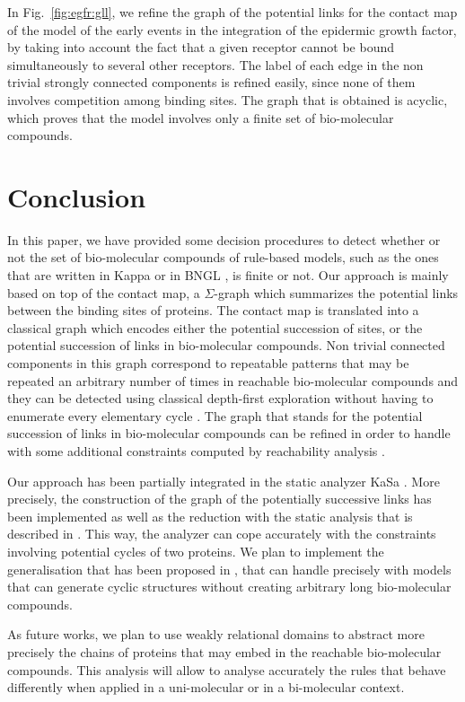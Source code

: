 \documentclass{entcs}
\begin{document}
\begin{exmp}
In Fig.~\ref{fig:egfr:gll}, we refine the graph of the potential links for the contact map of the model of the early events in the integration of the epidermic growth factor, by taking into account the fact that a given receptor cannot be bound simultaneously to several other receptors. The label of each edge in the non trivial strongly connected components is refined easily, since none of them involves competition among binding sites. The graph that is obtained is acyclic, which proves that the model involves only a finite set of bio-molecular compounds.
\end{exmp}


\label{sec:refinement}
\section{Conclusion}

In this paper, we have provided some decision procedures
to detect whether or not the set of bio-molecular compounds of rule-based models, such as the ones that are written in Kappa \cite{DBLP:journals/tcs/DanosL04} or in BNGL \cite{BNGL}, is finite or not.
Our approach is mainly based on top of the contact map, a $\Sigma$-graph which summarizes
the potential links between the binding sites of proteins. The contact map is translated into a classical graph which encodes either the potential succession of sites, or the potential succession of links in bio-molecular compounds.
Non trivial connected components in this graph correspond to repeatable patterns that may be repeated an arbitrary number of times in reachable bio-molecular compounds and they can be detected using classical depth-first exploration without having to enumerate every elementary cycle \cite{tarjan}.
The graph that stands for the potential succession of links in bio-molecular compounds can be refined in order to handle with some additional constraints  computed by reachability analysis \cite{DanosEtAl-VMCAI08,SASB2016,KaSa}.

Our approach has been partially integrated in the static analyzer KaSa \cite{KaSa}. More precisely, the construction of the graph of the potentially
successive links has been implemented as well as the reduction with the static analysis that is described in \cite{SASB2016}. This way, the analyzer can cope accurately with the constraints involving potential cycles of two proteins.  We plan to implement the generalisation that has been proposed in \cite{afp}, that can handle precisely with models that can generate cyclic structures without creating arbitrary long bio-molecular compounds.

As future works, we plan to use weakly relational domains \cite{DBLP:conf/sas/Mine02} to abstract more precisely the chains of proteins that may embed in the reachable bio-molecular compounds. This analysis will allow to analyse accurately the rules that behave differently when applied in a uni-molecular or in a bi-molecular context.



\end{document}
